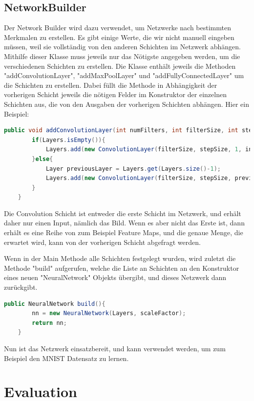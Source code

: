 \documentclass[12pt]{article}
\begin{document}
\subsection{NetworkBuilder}
Der Network Builder wird dazu verwendet, um Netzwerke nach bestimmten Merkmalen zu erstellen. Es gibt einige Werte, die wir nicht manuell eingeben müssen, weil sie vollständig von den anderen Schichten im Netzwerk abhängen. Mithilfe dieser Klasse muss jeweils nur das Nötigste angegeben werden, um die verschiedenen Schichten zu erstellen.
Die Klasse enthält jeweils die Methoden "addConvolutionLayer", "addMaxPoolLayer" und "addFullyConnectedLayer" um die Schichten zu erstellen. Dabei füllt die Methode in Abhängigkeit der vorherigen Schicht jeweils die nötigen Felder im Konstruktor der einzelnen Schichten aus, die von den Ausgaben der vorherigen Schichten abhängen. Hier ein Beispiel:
\begin{lstlisting}[language=Java]
public void addConvolutionLayer(int numFilters, int filterSize, int stepSize, double learnRate){
        if(Layers.isEmpty()){
            Layers.add(new ConvolutionLayer(filterSize, stepSize, 1, inputRows, inputCols, numFilters, learnRate));
        }else{
            Layer previousLayer = Layers.get(Layers.size()-1);
            Layers.add(new ConvolutionLayer(filterSize, stepSize, previousLayer.getOutputLength(), previousLayer.getOutputRows(), previousLayer.getOutputCols(), numFilters, learnRate));
        }
    }
\end{lstlisting}
Die Convolution Schicht ist entweder die erste Schicht im Netzwerk, und erhält daher nur einen Input, nämlich das Bild. Wenn es aber nicht das Erste ist, dann erhält es eine Reihe von zum Beispiel Feature Maps, und die genaue Menge, die erwartet wird, kann von der vorherigen Schicht abgefragt werden.

Wenn in der Main Methode alle Schichten festgelegt wurden, wird zuletzt die Methode "build" aufgerufen, welche die Liste an Schichten an den Konstruktor eines neuen "NeuralNetwork" Objekts übergibt, und dieses Netzwerk dann zurückgibt.
\begin{lstlisting}[language=Java]
public NeuralNetwork build(){
        nn = new NeuralNetwork(Layers, scaleFactor);
        return nn;
    }
\end{lstlisting}

Nun ist das Netzwerk einsatzbereit, und kann verwendet werden, um zum Beispiel den MNIST Datensatz zu lernen.


\cleardoublepage
\section{Evaluation}
\end{document}
